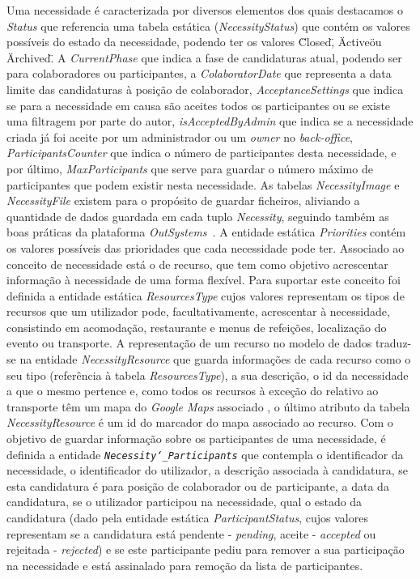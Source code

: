  
Uma necessidade é caracterizada por diversos elementos dos quais destacamos o \textit{Status} que referencia uma tabela estática (\textit{NecessityStatus}) que contém os valores possíveis do estado da necessidade, 
podendo ter os valores \"Closed\", \"Active\" ou \"Archived\". A \textit{CurrentPhase} que indica a fase de candidaturas atual, 
podendo ser para colaboradores ou participantes, a \textit{ColaboratorDate} que representa a data limite das candidaturas 
à posição de colaborador, \textit{AcceptanceSettings} que indica se para a necessidade em causa são aceites todos os participantes ou se existe uma filtragem por parte do autor, 
\textit{isAcceptedByAdmin} que indica se a necessidade criada já foi aceite por um administrador ou um \textit{owner} no \textit{back-office}, 
\textit{ParticipantsCounter} que indica o número de participantes desta necessidade, e por último, \textit{MaxParticipants} que serve para guardar o número máximo de participantes que podem existir nesta necessidade. 
As tabelas \textit{NecessityImage} e \textit{NecessityFile} existem para o propósito de guardar ficheiros, 
aliviando a quantidade de dados guardada em cada tuplo \textit{Necessity}, 
seguindo também as boas práticas da plataforma \textit{OutSystems~\cite{outsystems}}.
A entidade estática \textit{Priorities} contém os valores possíveis das prioridades que cada necessidade pode ter.
Associado ao conceito de necessidade está o de recurso, que tem como objetivo acrescentar informação à necessidade de uma forma flexível. 
Para suportar este conceito foi definida a entidade estática \textit{ResourcesType} cujos valores representam os tipos de recursos que um utilizador pode, facultativamente, acrescentar à necessidade, consistindo em acomodação, restaurante e menus de refeições, localização do evento ou transporte. 
A representação de um recurso no modelo de dados traduz-se na entidade \textit{NecessityResource} que guarda informações de cada recurso como o seu tipo (referência à tabela  \textit{ResourcesType}), a sua descrição, o id da necessidade a que o mesmo pertence e, como todos os recursos à exceção do relativo ao transporte têm um mapa do \textit{Google Maps} associado
, o último atributo da tabela \textit{NecessityResource} é um id do marcador do mapa associado ao recurso.
Com o objetivo de guardar informação sobre os participantes de uma necessidade, é definida a entidade \texttt{\textit{Necessity\char`_Participants}} que 
contempla o identificador da necessidade, o identificador do utilizador, a descrição associada à candidatura, 
se esta candidatura é para posição de colaborador ou de participante, a data da candidatura, se o utilizador participou na necessidade, qual o estado da candidatura (dado pela entidade estática \textit{ParticipantStatus}, cujos valores representam se a candidatura está pendente - \textit{pending}, aceite - \textit{accepted} ou rejeitada - \textit{rejected}) e se este participante pediu para remover a sua participação na necessidade e está assinalado para remoção da lista de participantes. 
